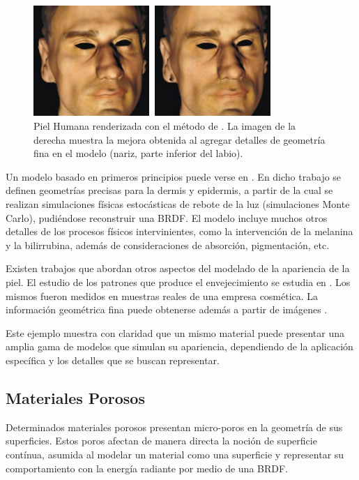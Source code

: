 \begin{figure}
\center
\includegraphics[width=9cm]{figures/piel}
\caption[Piel Humana renderizada]{Piel Humana renderizada con el método de \cite{Marschner2000}. La imagen de la derecha muestra la mejora obtenida al agregar detalles de geometría fina en el modelo (nariz, parte inferior del labio).}
\label{fg:piel}
\end{figure}

Un modelo basado en primeros principios puede verse en \cite{Krishnaswamy2004}.
En dicho trabajo se definen geometrías precisas para la dermis y epidermis, a partir de la cual se realizan simulaciones físicas estocásticas de rebote de la luz (simulaciones Monte Carlo), pudiéndose reconstruir una BRDF.
El modelo incluye muchos otros detalles de los procesos físicos intervinientes, como la intervención de la melanina y la bilirrubina, además de consideraciones de absorción, pigmentación, etc.

Existen trabajos que abordan otros aspectos del modelado de la apariencia de la piel.
El estudio de los patrones que produce el envejecimiento se estudia en \cite{Boissieux2000}.
Los mismos fueron medidos en muestras reales de una empresa cosmética.
La información geométrica fina puede obtenerse además a partir de imágenes \cite{Golovinskiy2006}.

Este ejemplo muestra con claridad que un mismo material puede presentar una amplia gama de modelos que simulan su apariencia, dependiendo de la aplicación específica y los detalles que se buscan representar.

\subsection{Materiales Porosos}

Determinados materiales porosos presentan micro-poros en la geometría de sus superficies.
Estos poros afectan de manera directa la noción de superficie contínua, asumida al modelar un material como una superficie y representar su comportamiento con la energía radiante por medio de una BRDF.

